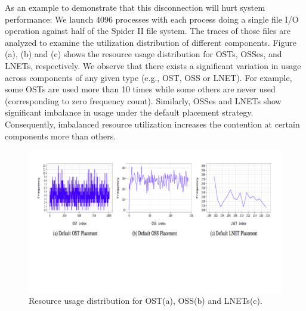 As an example to demonstrate that this disconnection will hurt
system performance: We launch 4096 processes with each process doing
a single file I/O operation against half of the Spider II file
system. The traces of those files are analyzed to examine the
utilization distribution of different components. Figure (a), (b)
and (c) shows the resource usage distribution for OSTs, OSSes, and
LNETs, respectively. We observe that there exists a significant
variation in usage across components of any given type (e.g., OST,
OSS or LNET). For example, some OSTs are used more than 10 times
while some others are never used (corresponding to zero frequency
count). Similarly, OSSes and LNETs show significant imbalance in
usage under the default placement strategy. Consequently, imbalanced
resource utilization increases the contention at certain components
more than others.



\begin{figure}[tbh]
  \centering
  \includegraphics[width=\columnwidth]{graphics/infrastructure.pdf}\vspace{-1.2in}
  \caption{Resource usage distribution for OST(a), OSS(b) and LNETs(c). }
\end{figure}


